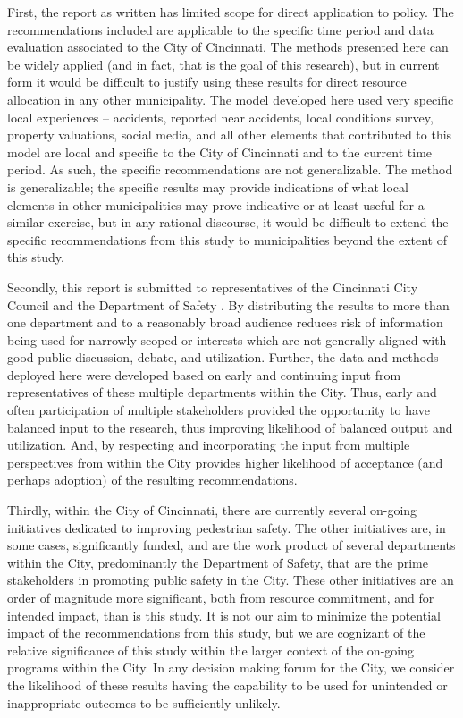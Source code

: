 \documentclass{llncs}
\begin{document}
First, the report as written has limited scope for direct application to policy. The recommendations included are applicable to the specific time period and data evaluation associated to the City of Cincinnati. The methods presented here can be widely applied (and in fact, that is the goal of this research), but in current form it would be difficult to justify using these results for direct resource allocation in any other municipality. The model developed here used very specific local experiences – accidents, reported near accidents, local conditions survey, property valuations, social media, and all other elements that contributed to this model are local and specific to the City of Cincinnati and to the current time period. As such, the specific recommendations are not generalizable. The method is generalizable; the specific results may provide indications of what local elements in other municipalities may prove indicative or at least useful for a similar exercise, but in any rational discourse, it would be difficult to extend the specific recommendations from this study to municipalities beyond the extent of this study.

Secondly, this report is submitted to representatives of the Cincinnati City Council and the Department of Safety . By distributing the results to more than one department and to a reasonably broad audience reduces risk of information being used for narrowly scoped  or interests which are not generally aligned with good public discussion, debate, and utilization. Further, the data and methods deployed here were developed based on early and continuing input from representatives of these multiple departments within the City. Thus, early and often participation of multiple stakeholders provided the opportunity to have balanced input to the research, thus improving likelihood of balanced output and utilization. And, by respecting and incorporating the input from multiple perspectives from within the City provides higher likelihood of acceptance (and perhaps adoption) of the resulting recommendations.

Thirdly, within the City of Cincinnati, there are currently several on-going initiatives dedicated to improving pedestrian safety. The other initiatives are, in some cases, significantly funded, and are the work product of several departments within the City, predominantly the Department of Safety, that are the prime stakeholders in promoting public safety in the City. These other initiatives are an order of magnitude more significant, both from resource commitment, and for intended impact, than is this study. It is not our aim to minimize the potential impact of the recommendations from this study, but we are cognizant of the relative significance of this study within the larger context of the on-going programs within the City. In any decision making forum for the City, we consider the likelihood of these results having the capability to be used for unintended or inappropriate outcomes to be sufficiently unlikely.
\end{document}
